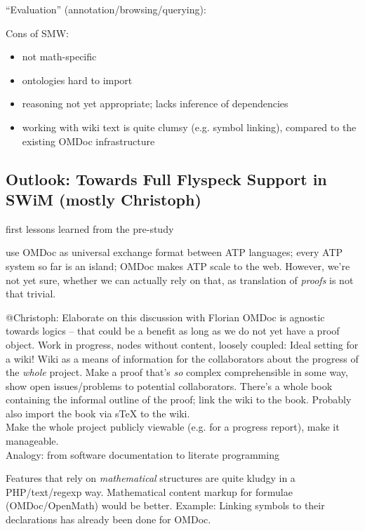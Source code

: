 \documentclass{llncs}
\begin{document}
``Evaluation'' (annotation/browsing/querying):

Cons of SMW:
\begin{itemize}
\item not math-specific
\item ontologies hard to import
\item reasoning not yet appropriate; lacks inference of dependencies
\item working with wiki text is quite clumsy (e.g. symbol linking), compared to the
existing OMDoc infrastructure
\end{itemize}

\subsection{Outlook: Towards Full Flyspeck Support in SWiM (mostly Christoph)}
\label{sec:flyspeck-swim}

first lessons learned from the pre-study

use OMDoc as universal exchange format between ATP languages; every ATP system so far is
an island; OMDoc makes ATP scale to the web.  However, we're not yet sure, whether we can actually rely on that, as translation of \emph{proofs} is not
that trivial.

\begin{todo}{@Christoph: Elaborate on this discussion with Florian}
  OMDoc is agnostic towards logics -- that could be a benefit as long as we do not yet
  have a proof object. Work in progress, nodes without content, loosely coupled: Ideal
  setting for a wiki!  Wiki as a means of information for the collaborators about the
  progress of the \emph{whole} project.  Make a proof that's \emph{so} complex
  comprehensible in some way, show open issues/problems to potential collaborators.
  There's a whole book containing the informal outline of the proof; link the wiki to the
  book.  Probably also import the book via sTeX to the wiki.\\
  Make the whole project publicly viewable (e.g. for a progress report), make it
  manageable.\\
  Analogy: from software documentation to literate programming
\end{todo}

Features that rely on \emph{mathematical} structures are quite kludgy in a PHP/text/regexp
way.  Mathematical content markup for formulae (OMDoc/OpenMath) would be better.  Example:
Linking symbols to their declarations has already been done for OMDoc.
\end{document}
